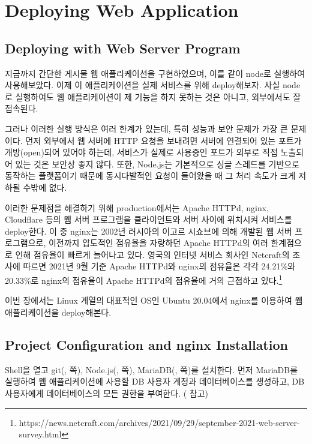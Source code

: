 \section{Deploying Web Application}\label{sect:deploying-web-application}

\subsection*{Deploying with Web Server Program}

지금까지 간단한 게시물 웹 애플리케이션을 구현하였으며, 이를 \와 같이 node로 실행하여 사용해보았다. 이제 이 애플리케이션을 실제 서비스를 위해 deploy해보자. 사실 node로 실행하여도 웹 애플리케이션이 제 기능을 하지 못하는 것은 아니고, 외부에서도 잘 접속된다.

그러나 이러한 실행 방식은 여러 한계가 있는데, 특히 성능과 보안 문제가 가장 큰 문제이다. 먼저 외부에서 웹 서버에 HTTP 요청을 보내려면 서버에 연결되어 있는 포트가 개방(open)되어 있어야 하는데, 서비스가 실제로 사용중인 포트가 외부로 직접 노출되어 있는 것은 보안상 좋지 않다. 또한, Node.js는 기본적으로 싱글 스레드를 기반으로 동작하는 플랫폼이기 때문에 동시다발적인 요청이 들어왔을 때 그 처리 속도가 크게 저하될 수밖에 없다.

이러한 문제점을 해결하기 위해 production에서는 Apache HTTPd, nginx, Cloudflare 등의 웹 서버 프로그램을 클라이언트와 서버 사이에 위치시켜 서비스를 deploy한다. 이 중 nginx는 2002년 러시아의 이고르 시쇼브에 의해 개발된 웹 서버 프로그램으로, 이전까지 압도적인 점유율을 자랑하던 Apache HTTPd의 여러 한계점으로 인해 점유율이 빠르게 늘어나고 있다. 영국의 인터넷 서비스 회사인 Netcraft의 조사에 따르면 2021년 9월 기준 Apache HTTPd와 nginx의 점유율은 각각 24.21\%와 20.33\%로 nginx의 점유율이 Apache HTTPd의 점유율에 거의 근접하고 있다.\footnote{https://news.netcraft.com/archives/2021/09/29/september-2021-web-server-survey.html}

이번 장에서는 Linux 계열의 대표적인 OS인 Ubuntu 20.04에서 nginx를 이용하여 웹 애플리케이션을 deploy해본다.

\subsection*{Project Configuration and nginx Installation}

Shell을 열고 git(, \pageref{shell:git-install-ubuntu}쪽), Node.js(, \pageref{shell:nodejs-linux-install}쪽), MariaDB(, \pageref{shell:mariadb-installation-ubuntu}쪽)를 설치한다. 먼저 MariaDB를 실행하여 웹 애플리케이션에 사용할 DB 사용자 계정과 데이터베이스를 생성하고, DB 사용자에게 데이터베이스의 모든 권한을 부여한다. ( 참고)

